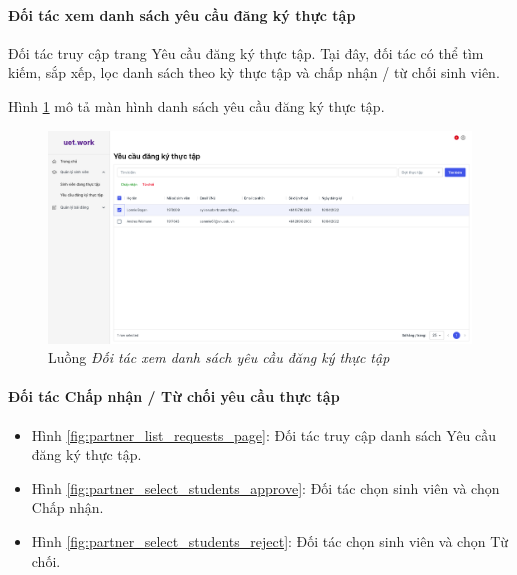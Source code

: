 \documentclass[./../main.tex]{subfiles}
\begin{document}
\paragraph*{Đối tác xem danh sách yêu cầu đăng ký thực tập}

Đối tác truy cập trang Yêu cầu đăng ký thực tập. Tại đây, đối tác có thể tìm kiếm, sắp xếp, lọc danh sách theo kỳ thực tập và chấp nhận / từ chối sinh viên.

Hình \ref{fig:partner_view_list_requests_page} mô tả màn hình danh sách yêu cầu đăng ký thực tập.

\begin{figure}[]
	\includegraphics[width=\linewidth]{./images/image29.png}
	\caption{Luồng \emph{Đối tác xem danh sách yêu cầu đăng ký thực tập}}
	\label{fig:partner_view_list_requests_page}
\end{figure}

\paragraph*{Đối tác Chấp nhận / Từ chối yêu cầu thực tập}

\begin{itemize}
	\item Hình \ref{fig:partner_list_requests_page}: Đối tác truy cập danh sách Yêu cầu đăng ký thực tập. 
	\item Hình \ref{fig:partner_select_students_approve}: Đối tác chọn sinh viên và chọn Chấp nhận.
	\item Hình \ref{fig:partner_select_students_reject}: Đối tác chọn sinh viên và chọn Từ chối.
\end{itemize}
\end{document}
